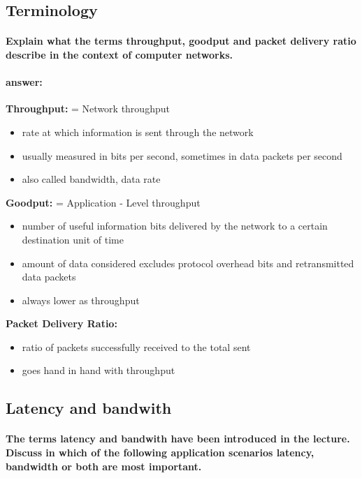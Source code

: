 \documentclass[a4paper,12pt]{article}
\begin{document}
 \subsection{Terminology}
 \paragraph{Explain what the terms throughput, goodput and packet delivery ratio describe in the context of computer networks.}
 \paragraph{answer:}
 
 \textbf{Throughput:} = Network throughput \\
 \begin{itemize}[itemsep=0pt]
 	\item  rate at which information is sent through the network
 	\item  usually measured in bits per second, sometimes in data packets per second
 	\item  also called bandwidth, data rate
 \end{itemize}

 \textbf{Goodput:}  = Application - Level throughput
 \begin{itemize}[itemsep=0pt]
 	 \item  number of useful information bits delivered by the network to a certain destination unit of time
 	\item  amount of data considered excludes protocol overhead bits and retransmitted data packets
 	\item  always lower as throughput
 \end{itemize}

 \textbf{Packet Delivery Ratio:}
 \begin{itemize}[itemsep=0pt]
 	\item  ratio of packets successfully received to the total sent
 	\item  goes hand in hand with throughput
 \end{itemize}
  
 
  \subsection{Latency and bandwith}
 \paragraph{The terms latency and bandwith have been introduced in the lecture. Discuss in which of the following application scenarios latency, bandwidth or both are most important.}
\end{document}
